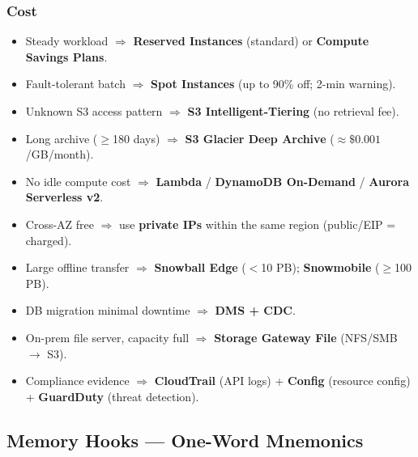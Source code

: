 \subsubsection{Cost}

\begin{keyfacts}
\begin{itemize}
  \item Steady workload $\Rightarrow$ \textbf{Reserved Instances} (standard) or \textbf{Compute Savings Plans}.
  \item Fault-tolerant batch $\Rightarrow$ \textbf{Spot Instances} (up to 90\% off; 2-min warning).
  \item Unknown S3 access pattern $\Rightarrow$ \textbf{S3 Intelligent-Tiering} (no retrieval fee).
  \item Long archive ($\geq$180 days) $\Rightarrow$ \textbf{S3 Glacier Deep Archive} ($\approx\$0.001$/GB/month).
  \item No idle compute cost $\Rightarrow$ \textbf{Lambda} / \textbf{DynamoDB On-Demand} / \textbf{Aurora Serverless v2}.
  \item Cross-AZ free $\Rightarrow$ use \textbf{private IPs} within the same region (public/EIP = charged).
  \item Large offline transfer $\Rightarrow$ \textbf{Snowball Edge} ($<$10 PB); \textbf{Snowmobile} ($\geq$100 PB).
  \item DB migration minimal downtime $\Rightarrow$ \textbf{DMS + CDC}.
  \item On-prem file server, capacity full $\Rightarrow$ \textbf{Storage Gateway File} (NFS/SMB $\to$ S3).
  \item Compliance evidence $\Rightarrow$ \textbf{CloudTrail} (API logs) + \textbf{Config} (resource config) + \textbf{GuardDuty} (threat detection).
\end{itemize}
\end{keyfacts}

\subsection{Memory Hooks --- One-Word Mnemonics}

